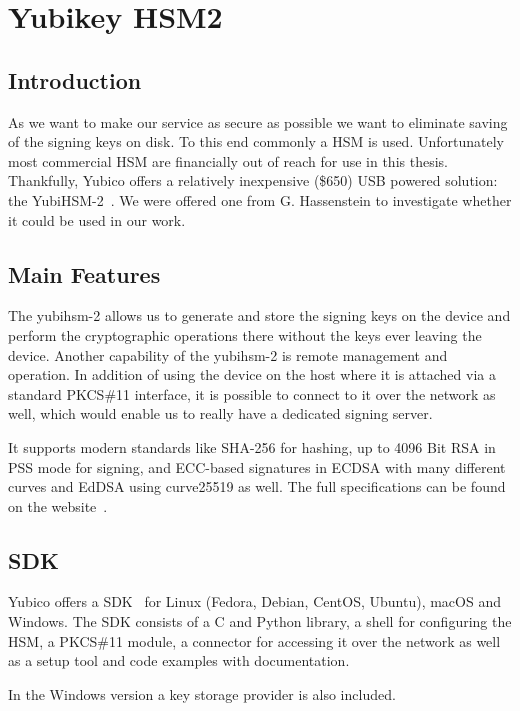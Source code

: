 \chapter{Yubikey HSM2}\label{ch:yubikey-hsm2}

\section{Introduction}\label{sec:yubiintroduction}
As we want to make our service as secure as possible we want to eliminate saving of the signing keys on disk.
To this end commonly a \gls{HSM} is used.
Unfortunately most commercial \gls{HSM} are financially out of reach for use in this thesis.
Thankfully, Yubico offers a relatively inexpensive (\$650) \gls{USB} powered solution: the YubiHSM-2~\cite{yubihsm}.
We were offered one from G. Hassenstein to investigate whether it could be used in our work.

\section{Main Features}\label{sec:technical-specification}
The yubihsm-2 allows us to generate and store the signing keys on the device and perform the cryptographic operations there without the keys ever leaving the device.
Another capability of the yubihsm-2 is remote management and operation.
In addition of using the device on the host where it is attached via a standard \gls{PKCS}\#11 interface,
it is possible to connect to it over the network as well,
which would enable us to really have a dedicated signing server.

It supports modern standards like \gls{SHA-256} for hashing, up to 4096 Bit \gls{RSA} in \gls{PSS} mode for signing,
and \gls{ECC}-based signatures in \gls{ECDSA} with many different curves and \gls{EdDSA} using curve25519 as well.
The full specifications can be found on the website~\cite{yubihsm}.

\section{SDK}\label{sec:sdk}
Yubico offers a \gls{SDK}~\cite{yubihsm} for Linux (Fedora, Debian, CentOS, Ubuntu), macOS and Windows.
The \gls{SDK} consists of a C and Python library, a shell for configuring the \gls{HSM},
a \gls{PKCS}\#11 module,
a connector for accessing it over the network as well as a setup tool and code examples with documentation.

In the Windows version a key storage provider is also included.

